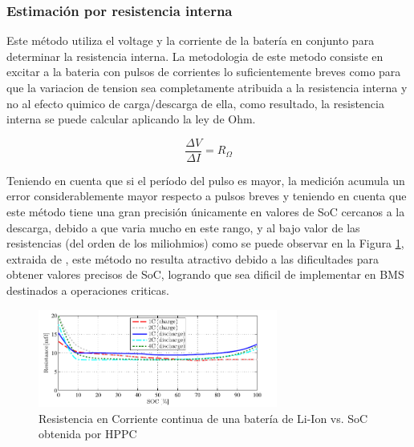\documentclass[10pt,a4paper]{article}
\begin{document}
    \clearpage

	\subsubsection{Estimación por resistencia interna}
	
	Este método utiliza el voltage y la corriente de la batería en 
    conjunto para determinar la resistencia interna. La metodologia de este
    metodo consiste en excitar a la bateria con pulsos de corrientes lo
    suficientemente breves como para que la variacion de tension sea
    completamente atribuida a la resistencia interna y no al efecto quimico de
    carga/descarga de ella, como resultado, la resistencia interna se puede
    calcular aplicando la ley de Ohm.
	
	\begin{figure}[h!]
		\begin{center}
			\begin{equation}
				\frac{\Delta V}{\Delta I} = R_\Omega 
				\label{Internal_resistance_EQ}
			\end{equation}	
		\end{center}
	\end{figure}
	
	\noindent Teniendo en cuenta que si el período del pulso es mayor, 
    la medición acumula un error considerablemente mayor respecto a pulsos breves 
    y teniendo en cuenta que este método tiene una gran precisión únicamente en 
    valores de SoC cercanos a la descarga, debido a que varia mucho en este rango, 
    y al bajo valor de las resistencias (del orden de los miliohmios) como se 
    puede observar en la Figura \ref{Internal_resistance}, 
    extraida de \cite{hentunen2014}, este método no resulta atractivo debido a 
    las dificultades para obtener valores precisos de SoC, logrando que sea
    dificil de implementar en BMS destinados a operaciones criticas.
	

	\begin{figure}[h!]
		\begin{center}
			\includegraphics[width=0.7\textwidth]{Ro_vs_SoC.png}
			\caption{Resistencia en Corriente continua de una batería de Li-Ion 
                     vs. SoC obtenida por HPPC}
			\label{Internal_resistance}
		\end{center}
	\end{figure}
\end{document}

